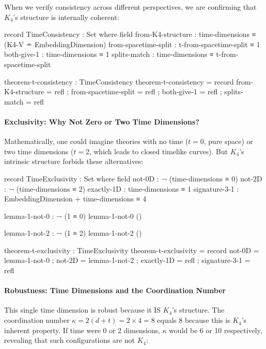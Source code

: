 \documentclass[11pt,a4paper]{book}
\begin{document}
When we verify consistency across different perspectives, we are confirming that $K_4$'s structure is internally coherent:

\begin{code}
record TimeConsistency : Set where
  field
    from-K4-structure     : time-dimensions ≡ (K4-V ∸ EmbeddingDimension)
    from-spacetime-split  : t-from-spacetime-split ≡ 1
    both-give-1           : time-dimensions ≡ 1
    splits-match          : time-dimensions ≡ t-from-spacetime-split

theorem-t-consistency : TimeConsistency
theorem-t-consistency = record
  { from-K4-structure    = refl
  ; from-spacetime-split = refl
  ; both-give-1          = refl
  ; splits-match         = refl
  }
\end{code}

\paragraph{Exclusivity: Why Not Zero or Two Time Dimensions?}

Mathematically, one could imagine theories with no time ($t = 0$, pure space) or two time dimensions ($t = 2$, which leads to closed timelike curves). But $K_4$'s intrinsic structure forbids these alternatives:

\begin{code}
record TimeExclusivity : Set where
  field
    not-0D         : ¬ (time-dimensions ≡ 0)
    not-2D         : ¬ (time-dimensions ≡ 2)
    exactly-1D     : time-dimensions ≡ 1
    signature-3-1  : EmbeddingDimension + time-dimensions ≡ 4

lemma-1-not-0 : ¬ (1 ≡ 0)
lemma-1-not-0 ()

lemma-1-not-2 : ¬ (1 ≡ 2)
lemma-1-not-2 ()

theorem-t-exclusivity : TimeExclusivity
theorem-t-exclusivity = record
  { not-0D         = lemma-1-not-0
  ; not-2D         = lemma-1-not-2
  ; exactly-1D     = refl
  ; signature-3-1  = refl
  }

\end{code}

\paragraph{Robustness: Time Dimensions and the Coordination Number}

This single time dimension is robust because it IS $K_4$'s structure. The coordination number $\kappa = 2(d + t) = 2 \times 4 = 8$ equals 8 because this is $K_4$'s inherent property. If time were 0 or 2 dimensions, $\kappa$ would be 6 or 10 respectively, revealing that such configurations are not $K_4$:
\end{document}
